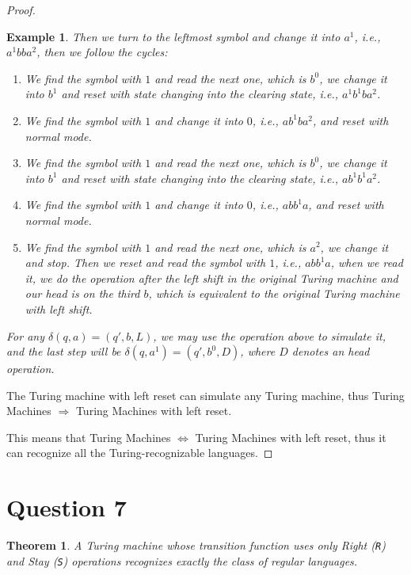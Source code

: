 \documentclass[a4paper, UTF-8]{article}
\theoremstyle{plain}
\newtheorem{theorem}{\indent Theorem}[section]
\newtheorem{example}{\indent Example}[section]
\begin{document}
\begin{proof}
\begin{example}
Then we turn to the leftmost symbol and change it into $a^1$, i.e., $a^1bba^2$, then we follow the cycles:
\begin{enumerate}
    \item We find the symbol with $1$ and read the next one, which is $b^0$, we change it into $b^1$ and reset with state changing into the clearing state, i.e., $a^1b^1ba^2$.
    \item We find the symbol with $1$ and change it into $0$, i.e., $ab^1ba^2$, and reset with normal mode.
    \item We find the symbol with $1$ and read the next one, which is $b^0$, we change it into $b^1$ and reset with state changing into the clearing state, i.e., $ab^1b^1a^2$.
    \item We find the symbol with $1$ and change it into $0$, i.e., $abb^1a$, and reset with normal mode.
    \item We find the symbol with $1$ and read the next one, which is $a^2$, we change it and stop. Then we reset and read the symbol with $1$, i.e., $abb^1a$, when we read it, we do the operation after the left shift in the original Turing machine and our head is on the third $b$, which is equivalent to the original Turing machine with left shift.
\end{enumerate}

For any $\delta(q, a) = (q', b, L)$, we may use the operation above to simulate it, and the last step will be $\delta(q, a^1) = (q', b^0, D)$, where $D$ denotes an head operation. 

\end{example}

The Turing machine with left reset can simulate any Turing machine, thus Turing Machines $\Rightarrow$ Turing Machines with left reset.

This means that Turing Machines $\Leftrightarrow$ Turing Machines with left reset, thus it can recognize all the Turing-recognizable languages.

\end{proof}

\section{Question 7} 

\begin{theorem}
    A Turing machine whose transition function uses only \emph{Right} (\texttt{R}) and \emph{Stay} (\texttt{S}) operations recognizes exactly the class of regular languages.
\end{theorem}
\end{document}
